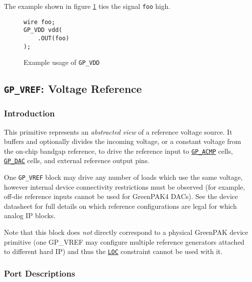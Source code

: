 \documentclass[11pt]{article}
\newcommand{\tokenstyle}[1]{\texttt{#1}}
\newcommand{\wirestyle}[1]{\texttt{#1}}
\newcommand{\tokenref}[2]{\hyperref[#2]{\tokenstyle{#1}}}
\begin{document}
The example shown in figure \ref{gp-vdd-example} ties the signal \wirestyle{foo} high.

\begin{figure}[h]
\begin{lstlisting}
wire foo;
GP_VDD vdd(
	.OUT(foo)
);
\end{lstlisting}
\caption{Example usage of \tokenstyle{GP\_VDD}}
\label{gp-vdd-example}
\end{figure}


\pagebreak
\subsection{\tokenstyle{GP\_VREF}: Voltage Reference}
\label{gp-vref}

\subsubsection{Introduction}
This primitive represents an \textit{abstracted view} of a reference voltage source. It buffers and optionally divides
the incoming voltage, or a constant voltage from the on-chip bandgap reference, to drive the reference input to
\tokenref{GP\_ACMP}{gp-acmp} cells, \tokenref{GP\_DAC}{gp-dac} cells, and external reference output pins.

One \tokenstyle{GP\_VREF} block may drive any number of loads which use the same voltage, however internal device
connectivity restrictions must be observed (for example, off-die reference inputs cannot be used for GreenPAK4 DACs).
See the device datasheet for full details on which reference configurations are legal for which analog IP blocks.

Note that this block does \textit{not} directly correspond to a physical GreenPAK device primitive (one GP\_VREF may
configure multiple reference generators attached to different hard IP) and thus the \tokenref{LOC}{constraint-loc}
constraint cannot be used with it.

\subsubsection{Port Descriptions}
\end{document}
